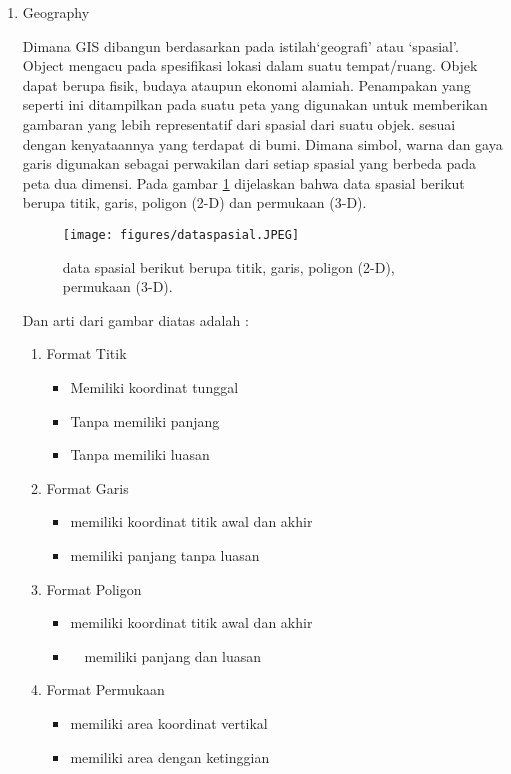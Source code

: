 \begin{enumerate}
\item Geography

Dimana GIS dibangun berdasarkan pada istilah‘geografi’ atau ‘spasial’.
Object mengacu pada spesifikasi lokasi dalam suatu tempat/ruang. Objek dapat berupa fisik,
budaya ataupun ekonomi alamiah. Penampakan yang seperti ini ditampilkan pada suatu peta yang 
digunakan untuk memberikan gambaran yang lebih representatif dari spasial dari suatu objek.
sesuai dengan kenyataannya yang terdapat di bumi. Dimana simbol, warna dan gaya garis digunakan sebagai
perwakilan dari setiap spasial yang berbeda pada peta dua dimensi.
Pada gambar \ref{dataspasial} dijelaskan bahwa data spasial berikut berupa 
titik, garis, poligon (2-D) dan permukaan (3-D).

\begin{figure}[ht]
	\centerline{\texttt{[image: figures/dataspasial.JPEG]}}
	\caption{data spasial berikut berupa titik, garis, poligon (2-D), permukaan (3-D).}
	\label{dataspasial}
	\end{figure}

Dan arti dari gambar diatas adalah :
\begin{enumerate}
\item
Format Titik 	
\begin{itemize}					
\item Memiliki koordinat tunggal 		
\item Tanpa memiliki panjang 			
\item Tanpa memiliki luasan
\end{itemize}

\item
Format Garis
\begin{itemize}		
\item memiliki koordinat titik awal dan akhir		
\item memiliki panjang tanpa luasan
\end{itemize}

\item
Format Poligon 	
\begin{itemize}						
\item memiliki koordinat titik awal dan akhir
\item　memiliki panjang dan luasan
\end{itemize} 		

\item
Format Permukaan
\begin{itemize}		
\item memiliki area koordinat vertikal
\item memiliki area dengan ketinggian
\end{itemize}		
\end{enumerate}


\end{enumerate}

